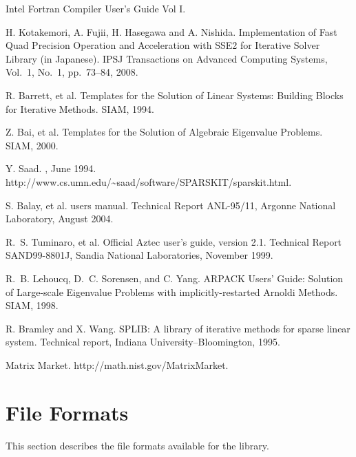 \documentclass[a4paper]{article}
\begin{document}
\begin{thebibliography}{10}
\newblock Intel Fortran Compiler User's Guide Vol I.

H. Kotakemori, A. Fujii, H. Hasegawa and A. Nishida.
\newblock Implementation of Fast Quad Precision Operation and
	Acceleration with SSE2 for Iterative Solver Library (in
	Japanese).
\newblock IPSJ Transactions on Advanced Computing Systems,  Vol.~1, No.~1, pp.\ 73--84, 2008.

R. Barrett, et al.
\newblock Templates for the Solution of Linear Systems: Building Blocks for Iterative Methods.
\newblock SIAM, 1994.

Z. Bai, et al.
\newblock Templates for the Solution of Algebraic Eigenvalue Problems.
\newblock SIAM, 2000.

Y. Saad.
, June 1994.
\newblock http://www.cs.umn.edu/\textasciitilde saad/software/SPARSKIT/sparskit.html.

S. Balay, et al.
 users manual.
\newblock Technical Report ANL-95/11, Argonne National Laboratory, August 2004.

R.~S. Tuminaro, et al.
\newblock Official {Aztec} user's guide, version 2.1.
\newblock Technical Report SAND99-8801J, Sandia National Laboratories, November
  1999.

R.~B. Lehoucq, D.~C. Sorensen, and C. Yang.
\newblock ARPACK Users' Guide: Solution of Large-scale Eigenvalue Problems with implicitly-restarted Arnoldi Methods. 
\newblock SIAM, 1998. 

R. Bramley and X. Wang.
\newblock SPLIB: A library of iterative methods for sparse linear system.
\newblock Technical report, Indiana University--Bloomington, 1995.

Matrix Market.
\newblock http://math.nist.gov/MatrixMarket.



\end{thebibliography}

\newpage
\appendix
\section{File Formats}
\label{sec:matinp}
This section describes the file formats available for the library.
\end{document}
